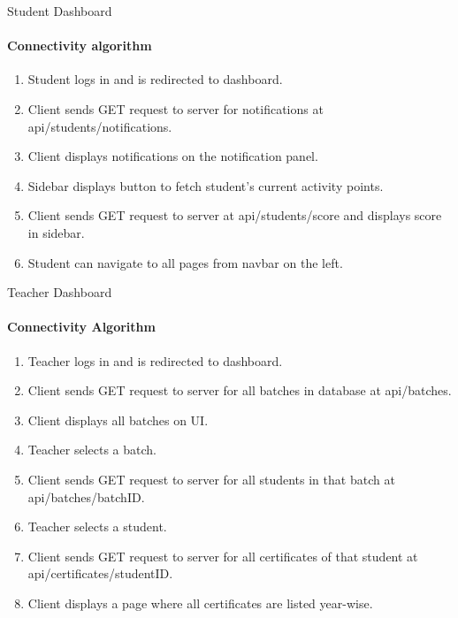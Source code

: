 \begin{frame}{Student Dashboard}
    \framesubtitle{Connectivity algorithm}
    \begin{enumerate}
        

\item Student logs in and is redirected to dashboard.
\item Client sends GET request to server for notifications at api/students/notifications.
\item Client displays notifications on the notification panel.
\item Sidebar displays button to fetch student's current activity points.
\item Client sends GET request to server at api/students/score and displays score in sidebar.
\item Student can navigate to all pages from navbar on the left.
    \end{enumerate}
\end{frame}

\begin{frame}{Teacher Dashboard}
    \framesubtitle{Connectivity Algorithm}
    \begin{enumerate}
        
\item Teacher logs in and is redirected to dashboard.
\item Client sends GET request to server for all batches in database at api/batches.
\item Client displays all batches on UI.
\item Teacher selects a batch.
\item Client sends GET request to server for all students in that batch at api/batches/{batchID}.
\item Teacher selects a student.
\item Client sends GET request to server for all certificates of that student at api/certificates/{studentID}.
\item Client displays a page where all certificates are listed year-wise.
    \end{enumerate}
    
\end{frame}

